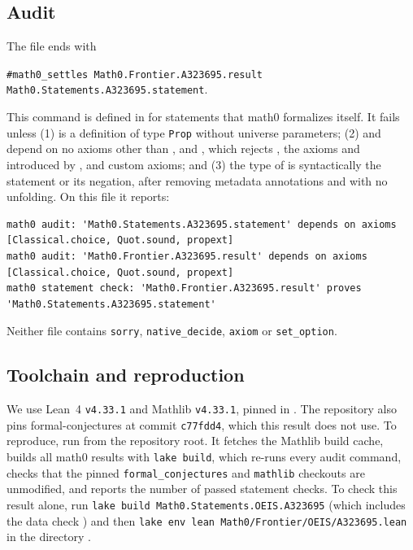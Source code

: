 \documentclass[11pt]{amsart}
\theoremstyle{plain}
\theoremstyle{definition}
\begin{document}
\subsection*{Audit}
The file ends with
\begin{center}
\texttt{\#math0\_settles Math0.Frontier.A323695.result Math0.Statements.A323695.statement}.
\end{center}
This command is defined in  for statements that math0 formalizes itself. It fails unless (1)  is a definition of type \texttt{Prop} without universe parameters; (2)  and  depend on no axioms other than ,  and , which rejects , the axioms  and  introduced by , and custom axioms; and (3) the type of  is syntactically the statement or its negation, after removing metadata annotations and with no unfolding. On this file it reports:
\begin{lstlisting}
math0 audit: 'Math0.Statements.A323695.statement' depends on axioms [Classical.choice, Quot.sound, propext]
math0 audit: 'Math0.Frontier.A323695.result' depends on axioms [Classical.choice, Quot.sound, propext]
math0 statement check: 'Math0.Frontier.A323695.result' proves 'Math0.Statements.A323695.statement'
\end{lstlisting}
Neither file contains \texttt{sorry}, \texttt{native\_decide}, \texttt{axiom} or \texttt{set\_option}.

\subsection*{Toolchain and reproduction}
We use Lean~4 \cite{Lean4} \texttt{v4.33.1} and Mathlib \cite{Mathlib} \texttt{v4.33.1}, pinned in . The repository also pins formal-conjectures \cite{FC} at commit \texttt{c77fdd4}, which this result does not use. To reproduce, run  from the repository root. It fetches the Mathlib build cache, builds all math0 results with \texttt{lake build}, which re-runs every audit command, checks that the pinned \texttt{formal\_conjectures} and \texttt{mathlib} checkouts are unmodified, and reports the number of passed statement checks. To check this result alone, run \texttt{lake build Math0.Statements.OEIS.A323695} (which includes the data check ) and then \texttt{lake env lean Math0/Frontier/OEIS/A323695.lean} in the directory .
\end{document}
